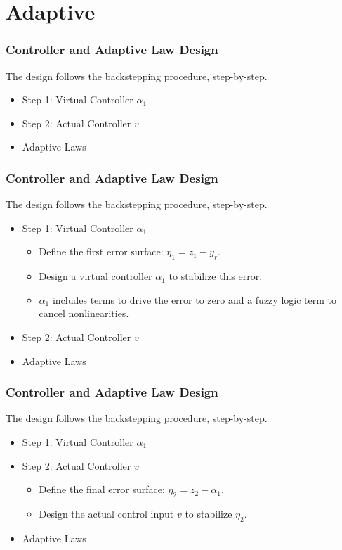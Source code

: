 \documentclass[18p]{beamer}
\begin{document}
\section{Adaptive}
\begin{frame}
	\frametitle{Controller and Adaptive Law Design}
	The design follows the backstepping procedure, step-by-step.
	\begin{itemize}
		\item Step 1: Virtual Controller $\alpha_1$
		\item Step 2: Actual Controller $v$
		\item Adaptive Laws
	\end{itemize}
\end{frame}
 \begin{frame}[noframenumbering]
 	\frametitle{Controller and Adaptive Law Design}
 	The design follows the backstepping procedure, step-by-step.
 	\begin{itemize}
 		\item Step 1: Virtual Controller $\alpha_1$
 		\begin{itemize}
 			\item Define the first error surface: $\eta_1=z_1-y_r$.
 			\item Design a virtual controller $\alpha_1$ to stabilize this error.
 			\item $\alpha_1$ includes terms to drive the error to zero and a fuzzy logic term to cancel nonlinearities.
 		\end{itemize}
 		\item Step 2: Actual Controller $v$
 		\item Adaptive Laws
 	\end{itemize}
 \end{frame}
 \begin{frame}[noframenumbering]
 	\frametitle{Controller and Adaptive Law Design}
 	The design follows the backstepping procedure, step-by-step.
 	\begin{itemize}
 		\item Step 1: Virtual Controller $\alpha_1$
 		\item Step 2: Actual Controller $v$
 		\begin{itemize}
 			\item Define the final error surface: $\eta_2=z_2-\alpha_1$.
 			\item Design the actual control input $v$ to stabilize $\eta_2$.
 		\end{itemize}
 		\item Adaptive Laws
 	\end{itemize}
 \end{frame}
\end{document}
